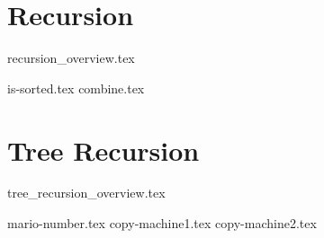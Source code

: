 \documentclass{exam}
\begin{document}
\section{Recursion}
{recursion_overview.tex}
\begin{questions}
{is-sorted.tex}
\pagebreak
{combine.tex}
\end{questions}

\pagebreak

\section{Tree Recursion}
{tree_recursion_overview.tex}
\pagebreak
\begin{questions}
{mario-number.tex}
\pagebreak
{copy-machine1.tex}
\pagebreak
{copy-machine2.tex}
\end{questions}
\end{document}
